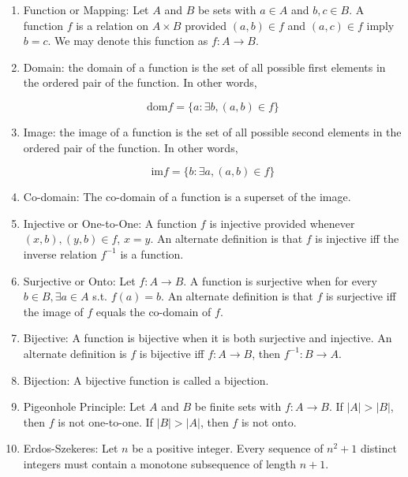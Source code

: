 \documentclass{article}
\begin{document}
	\begin{enumerate}
		
		\item Function or Mapping: Let $A$ and $B$ be sets with $a\in A$ and $b,c\in B$.
		A function $f$ is a relation on $A\times B$ provided $(a,b)\in f$ and $(a,c)\in f$ imply $b=c$.
		We may denote this function as $f: A\to B$.
		
		\item Domain: the domain of a function is the set of all possible first elements in the ordered pair of the function.
		In other words,
		
		\[\text{dom} f= \{a: \exists b, (a,b)\in f\}\]
		
		\item Image: the image of a function is the set of all possible second elements in the ordered pair of the function.
		In other words,
		
		\[\text{im} f= \{b: \exists a, (a,b)\in f\}\]
		
		\item Co-domain: The co-domain of a function is a superset of the image.
		
		\item Injective or One-to-One: A function $f$ is injective provided whenever $(x,b),(y,b)\in f$, $x=y$.
		An alternate definition is that $f$ is injective iff the inverse relation $f^{-1}$ is a function.
		
		\item Surjective or Onto: Let $f:A\to B$.
		A function is surjective when for every $b\in B, \exists a\in A$ s.t. $f(a)=b$.
		An alternate definition is that $f$ is surjective iff the image of $f$ equals the co-domain of $f$.
		
		\item Bijective: A function is bijective when it is both surjective and injective.
		An alternate definition is $f$ is bijective iff $f:A\to B$, then $f^{-1}:B\to A$.
		
		\item Bijection: A bijective function is called a bijection.
		
		\item Pigeonhole Principle: Let $A$ and $B$ be finite sets with $f:A\to B$.
		If $|A|>|B|$, then $f$ is not one-to-one.
		If $|B|>|A|$, then $f$ is not onto.
		
		\item Erdos-Szekeres: Let $n$ be a positive integer.
		Every sequence of $n^2+1$ distinct integers must contain a monotone subsequence of length $n+1$.
		

\end{enumerate}
\end{document}
